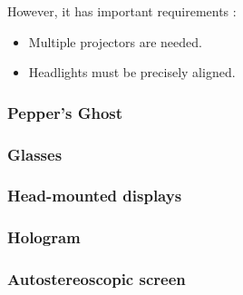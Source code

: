 However, it has important requirements : 
\begin{itemize}
\item Multiple projectors are needed.
\item Headlights must be precisely aligned.
\end{itemize}


\subsubsection{Pepper's Ghost}
\subsubsection{Glasses}
\subsubsection{Head-mounted displays}
\subsubsection{Hologram}
\subsubsection{Autostereoscopic screen}
